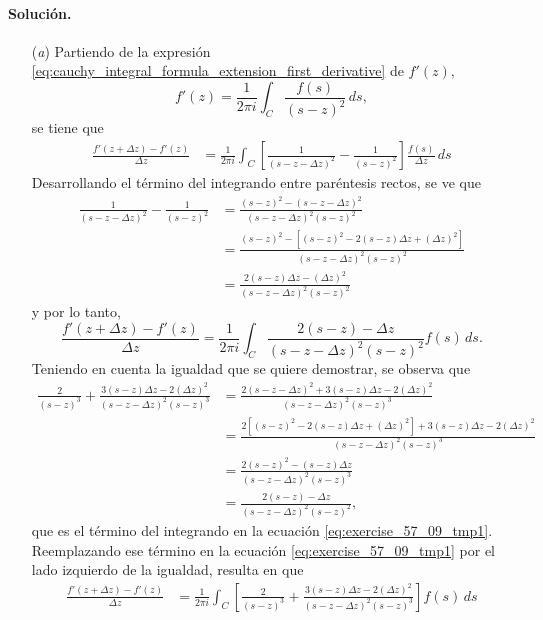 \documentclass[a4paper]{report}
\begin{document}
\paragraph{Solución.} 
\begin{enumerate}
 \item[(\textit{a})] Partiendo de la expresión \ref{eq:cauchy_integral_formula_extension_first_derivative} de \(f'(z)\),
 \[
  f'(z)=\frac{1}{2\pi i}\int_C\frac{f(s)}{(s-z)^2}\,ds, 
 \]
 se tiene que
 \begin{align*}
  \frac{f'(z+\Delta z)-f'(z)}{\Delta z}&=\frac{1}{2\pi i}\int_C\left[\frac{1}{(s-z-\Delta z)^2}-\frac{1}{(s-z)^2}\right]\frac{f(s)}{\Delta z}\,ds
 \end{align*}
 Desarrollando el término del integrando entre paréntesis rectos, se ve que 
 \begin{align*}
  \frac{1}{(s-z-\Delta z)^2}-\frac{1}{(s-z)^2}&=\frac{(s-z)^2-(s-z-\Delta z)^2}{(s-z-\Delta z)^2(s-z)^2}\\
   &=\frac{(s-z)^2-\left[(s-z)^2-2(s-z)\Delta z+(\Delta z)^2\right]}{(s-z-\Delta z)^2(s-z)^2}\\
   &=\frac{2(s-z)\Delta z-(\Delta z)^2}{(s-z-\Delta z)^2(s-z)^2}
 \end{align*}
 y por lo tanto,
 \begin{equation}\label{eq:exercise_57_09_tmp1}
  \frac{f'(z+\Delta z)-f'(z)}{\Delta z}=\frac{1}{2\pi i}\int_C\frac{2(s-z)-\Delta z}{(s-z-\Delta z)^2(s-z)^2}f(s)\,ds.  
 \end{equation}
 Teniendo en cuenta la igualdad que se quiere demostrar, se observa que 
 \begin{align*}
  \frac{2}{(s-z)^3}+\frac{3(s-z)\Delta z-2(\Delta z)^2}{(s-z-\Delta z)^2(s-z)^3}&=\frac{2(s-z-\Delta z)^2+3(s-z)\Delta z-2(\Delta z)^2}{(s-z-\Delta z)^2(s-z)^3}\\
  &=\frac{2\left[(s-z)^2-2(s-z)\Delta z+(\Delta z)^2\right]+3(s-z)\Delta z-2(\Delta z)^2}{(s-z-\Delta z)^2(s-z)^3}\\
  &=\frac{2(s-z)^2-(s-z)\Delta z}{(s-z-\Delta z)^2(s-z)^3}\\
  &=\frac{2(s-z)-\Delta z}{(s-z-\Delta z)^2(s-z)^2},
 \end{align*}
 que es el término del integrando en la ecuación \ref{eq:exercise_57_09_tmp1}. Reemplazando ese término en la ecuación \ref{eq:exercise_57_09_tmp1} por el lado izquierdo de la igualdad, resulta en que 
 \begin{align*}
  \frac{f'(z+\Delta z)-f'(z)}{\Delta z}&=\frac{1}{2\pi i}\int_C\left[\frac{2}{(s-z)^3}+\frac{3(s-z)\Delta z-2(\Delta z)^2}{(s-z-\Delta z)^2(s-z)^3}\right]f(s)\,ds\\

\end{align*}
\end{enumerate}
\end{document}
